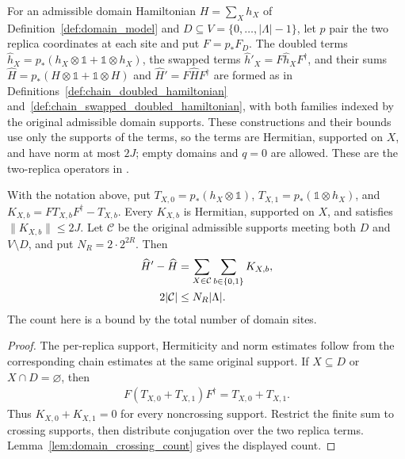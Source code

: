 For an admissible domain Hamiltonian $H=\sum_Xh_X$ of
Definition~\ref{def:domain_model} and $D\subseteq V=\{0,\ldots,|\Lambda|-1\}$,
let $p$ pair the two replica coordinates at each site and put $F=p_*F_D$.
The doubled terms
$\widehat h_X=p_*(h_X\otimes\mathbb 1+\mathbb 1\otimes h_X)$, the swapped
terms $\widehat h'_X=F\widehat h_XF^\dagger$, and their sums
$\widehat H=p_*(H\otimes\mathbb 1+\mathbb 1\otimes H)$ and
$\widehat H'=F\widehat HF^\dagger$ are formed as in
Definitions~\ref{def:chain_doubled_hamiltonian}
and~\ref{def:chain_swapped_doubled_hamiltonian}, with both families indexed
by the original admissible domain supports. These constructions and their
bounds use only the supports of the terms, so the terms are Hermitian,
supported on $X$, and have norm at most $2J$; empty domains and $q=0$ are
allowed. These are the two-replica operators in
\cite[Part~IIa]{TNLean2026OneDimensional}.

\begin{lemma}
    \label{thm:domain_partial_swap_crossing}
    \leanok
    With the notation above,
    put $T_{X,0}=p_*(h_X\otimes\mathbb 1)$,
    $T_{X,1}=p_*(\mathbb 1\otimes h_X)$, and
    $K_{X,b}=FT_{X,b}F^\dagger-T_{X,b}$.
    Every $K_{X,b}$ is Hermitian, supported on $X$, and satisfies
    $\|K_{X,b}\|\le2J$. Let $\mathcal C$ be the original admissible supports
    meeting both $D$ and $V\setminus D$, and put $N_R=2\cdot2^{2R}$. Then
    \begin{align}
        \widehat H'-\widehat H
                      & =\sum_{X\in\mathcal C}\sum_{b\in\{0,1\}}K_{X,b},\notag \\
        2|\mathcal C| & \le N_R|\Lambda|.\notag
    \end{align}
    The count here is a bound by the total number of domain sites.
\end{lemma}
\begin{proof}\leanok
    The per-replica support, Hermiticity and norm estimates follow from
    the corresponding chain estimates at the same original support.
    If $X\subseteq D$ or $X\cap D=\varnothing$, then
    \begin{align*}
        F(T_{X,0}+T_{X,1})F^\dagger=T_{X,0}+T_{X,1}.
    \end{align*}
    Thus $K_{X,0}+K_{X,1}=0$ for every noncrossing support.
    Restrict the finite sum to crossing supports, then distribute conjugation
    over the two replica terms. Lemma~\ref{lem:domain_crossing_count} gives
    the displayed count.
\end{proof}

